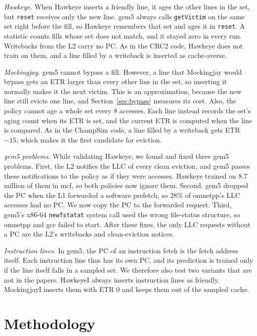 \documentclass[11pt,conference]{IEEEtran}
\begin{document}
\emph{Hawkeye.} When Hawkeye inserts a friendly line, it ages the other lines in
the set, but \texttt{reset} receives only the new line. gem5 always calls
\texttt{getVictim} on the same set right before the fill, so Hawkeye remembers
that set and ages it in \texttt{reset}. A statistic counts fills whose set does
not match, and it stayed zero in every run. Writebacks from the L2 carry no PC.
As in the CRC2 code, Hawkeye does not train on them, and a line filled by a
writeback is inserted as cache-averse.

\emph{Mockingjay.} gem5 cannot bypass a fill. However, a line that Mockingjay
would bypass gets an ETR larger than every other line in the set, so inserting
it normally makes it the next victim. This is an approximation, because the new
line still evicts one line, and Section~\ref{sec:bypass} measures its cost.
Also, the policy cannot age a whole set every 8 accesses. Each line instead
records the set's aging count when its ETR is set, and the current ETR is
computed when the line is compared. As in the ChampSim code, a line filled by a writeback gets
ETR $-15$, which makes it the first candidate for eviction.

\emph{gem5 problems.} While validating Hawkeye, we found and fixed three gem5
problems. First, the L2 notifies the LLC of every clean eviction, and gem5
passes these notifications to the policy as if they were accesses. Hawkeye
trained on 8.7 million of them in mcf, so both policies now ignore them.
Second, gem5 dropped the PC when the L1 forwarded a software prefetch, so 28\%
of omnetpp's LLC accesses had no PC. We now copy the PC to the forwarded
request. Third, gem5's x86-64 \texttt{newfstatat} system call used the wrong
file-status structure, so omnetpp and gcc failed to start. After these fixes,
the only LLC requests without a PC are the L2's writebacks and clean-eviction
notices.

\emph{Instruction lines.} In gem5, the PC of an instruction fetch is the fetch
address itself. Each instruction line thus has its own PC, and its prediction
is trained only if the line itself falls in a sampled set. We therefore also test two
variants that are not in the papers. HawkeyeI always inserts instruction lines
as friendly. MockingjayI inserts them with ETR 0 and keeps them out of the
sampled cache.

\section{Methodology}
\label{sec:method}
\end{document}
